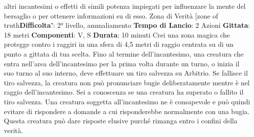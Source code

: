 \begin{multicols}{2}
altri incantesimi o effetti di simili potenza impiegati per
influenzare la mente del bersaglio o per ottenere
informazioni su di esso.
Zona di Verità
[zone of truth\textbf{Difficolta'}:
2° livello, ammaliamento
\textbf{Tempo di Lancio}: 2 Azioni
\textbf{Gittata}: 18 metri
\textbf{Componenti}: V, S
\textbf{Durata}: 10 minuti
Crei una zona magica che protegge contro i raggiri in
una sfera di 4,5 metri di raggio centrata su di un punto a
gittata di tua scelta. Fino al termine dell’incantesimo,
una creatura che entra nell’area dell’incantesimo per la
prima volta durante un turno, o inizia il suo turno al suo
interno, deve effettuare un tiro salvezza su Arbitrio. Se
fallisce il tiro salvezza, la creatura non può pronunciare
bugie deliberatamente mentre è nel raggio
dell’incantesimo. Sei a conoscenza se una creatura ha
superato o fallito il tiro salvezza.
Una creatura soggetta all’incantesimo ne è
consapevole e può quindi evitare di rispondere a
domande a cui risponderebbe normalmente con una
bugia. Questa creatura può dare risposte elusive
purché rimanga entro i confini della verità.

\end{multicols}